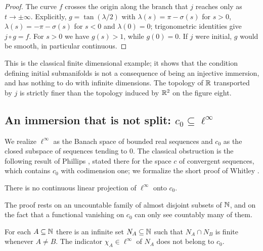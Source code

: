 \begin{proof}
  \leanok
  The curve $f$ crosses the origin along the branch that $j$ reaches only as $t \to \pm\infty$.
  Explicitly, $g = \tan(\lambda/2)$ with $\lambda(s) = \pi - \sigma(s)$ for $s > 0$,
  $\lambda(s) = -\pi - \sigma(s)$ for $s < 0$ and $\lambda(0) = 0$; trigonometric identities give
  $j \circ g = f$. For $s > 0$ we have $g(s) > 1$, while $g(0) = 0$. If $j$ were initial, $g$
  would be smooth, in particular continuous.
\end{proof}

\begin{remark}
  This is the classical finite dimensional example; it shows that the condition defining
  initial submanifolds is not a consequence of being an injective immersion, and has nothing to
  do with infinite dimensions. The topology of $\mathbb{R}$ transported by $j$ is strictly finer than the
  topology induced by $\mathbb{R}^2$ on the figure eight.
\end{remark}

\subsection{An immersion that is not split: \texorpdfstring{$c_0 \subseteq \ell^\infty$}{c0 in l-infinity}}

We realize $\ell^\infty$ as the Banach space of bounded real sequences and $c_0$ as the closed
subspace of sequences tending to $0$. The classical obstruction is the following result of
Phillips \cite[7.5, pp.~539--540]{Phi40}, stated there for the space $c$ of convergent
sequences, which contains $c_0$ with codimension one; we formalize the short proof of Whitley \cite{Whi66}.

\begin{theorem}
  \label{thm:ex-phillips}
  \leanok
  There is no continuous linear projection of $\ell^\infty$ onto $c_0$.
\end{theorem}

The proof rests on an uncountable family of almost disjoint subsets of $\mathbb{N}$, and on the fact
that a functional vanishing on $c_0$ can only see countably many of them.

\begin{lemma}
  \label{lem:ex-almost-disjoint}
  \leanok
  For each $A \subseteq \mathbb{N}$ there is an infinite set $N_A \subseteq \mathbb{N}$ such that
  $N_A \cap N_B$ is finite whenever $A \ne B$. The indicator $\chi_A \in \ell^\infty$ of $N_A$
  does not belong to $c_0$.
\end{lemma}

